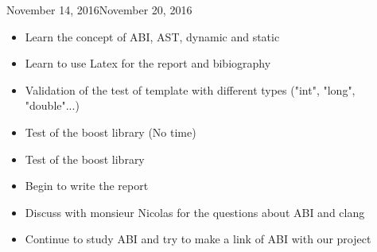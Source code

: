 \begin{fichesuivi}{November 14, 2016}{November 20, 2016}

   \begin{travaileffectue}
        \begin{itemize}
            \item Learn the concept of ABI, AST, dynamic and static
            \item Learn to use Latex for the report and bibiography
            \item Validation of the test of template with different types ("int", "long", "double"...)
        \end{itemize}
   \end{travaileffectue}

   \begin{travailnoneffectue}
          \begin{itemize}
             \item Test of the boost library (No time) 
          \end{itemize}
   \end{travailnoneffectue}

   \begin{planification}
        \begin{itemize}
            \item Test of the boost library
            \item Begin to write the report
            \item Discuss with monsieur Nicolas for the questions about ABI and clang
            \item Continue to study ABI and try to make a link of ABI with our project
        \end{itemize}
   \end{planification}
\end{fichesuivi}




